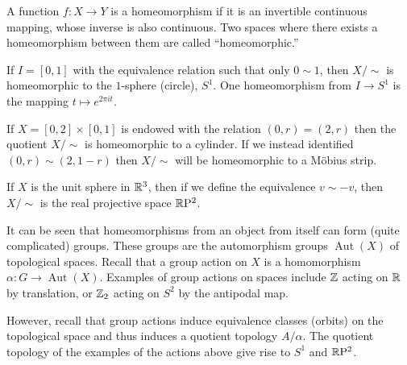 \begin{definition}[Homeomorphism]
    A function $f \colon X \to Y$ is a homeomorphism if it is an invertible continuous mapping, whose inverse is also continuous. Two spaces where there exists a homeomorphism between them are called ``homeomorphic.'' 
\end{definition}

\begin{example}[Circle]
    If $I = [0, 1]$ with the equivalence relation such that only $0 \sim 1$, then $X/\!\sim$ is homeomorphic to the $1$-sphere (circle), $S^1$. One homeomorphism from $I \to S^1$ is the mapping $t \mapsto e^{2\pi i t}.$
\end{example}

\begin{example}
    If $X = [0, 2] \times [0, 1]$ is endowed with the relation $(0, r) = (2, r)$ then the quotient $X/\!\sim$ is homeomorphic to a cylinder. If we instead identified $(0, r) \sim (2, 1 - r)$ then $X/\!\sim$ will be homeomorphic to a M\"obius strip.
\end{example}

\begin{example}
    If $X$ is the unit sphere in $\mathbb R^3$, then if we define the equivalence $v \sim -v$, then $X/\!\sim$ is the real projective space $\mathbb R\mathrm P^2$.
\end{example}

\begin{example}
    It can be seen that homeomorphisms from an object from itself can form (quite complicated) groups. These groups are the automorphism groups $\operatorname{Aut}(X)$ of topological spaces. Recall that a group action on $X$ is a homomorphism $\alpha \colon G \to \operatorname{Aut}(X)$. Examples of group actions on spaces include $\mathbb Z$ acting on $\mathbb R$ by translation, or $\mathbb Z_2$ acting on $S^2$ by the antipodal map. 

    However, recall that group actions induce equivalence classes (orbits) on the topological space and thus induces a quotient topology $A/\alpha$. The quotient topology of the examples of the actions above give rise to $S^1$ and $\mathbb R \mathrm P^2$.
\end{example}


